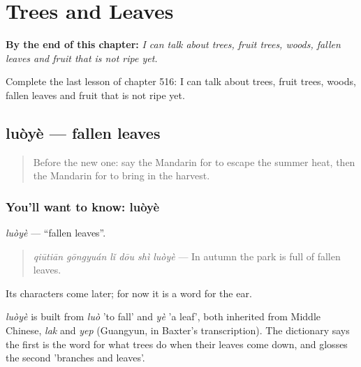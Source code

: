 
\chapter{Trees and Leaves}
\label{ch:zh-trees-and-leaves}

\begin{chapteropening}
\textbf{By the end of this chapter:} \emph{I can talk about trees, fruit trees, woods, fallen leaves and fruit that is not ripe yet.}

Complete the last lesson of chapter 516: I can talk about trees, fruit trees, woods, fallen leaves and fruit that is not ripe yet.
\end{chapteropening}

\section[luòyè]{luòyè — fallen leaves}

\label{lesson:ZH-C516-luoye}



\begin{quote}
Before the new one: say the Mandarin for to escape the summer heat, then the Mandarin for to bring in the harvest.
\end{quote}

\subsection*{You'll want to know: luòyè}
\emph{luòyè} — \textquotedblleft{}fallen leaves\textquotedblright{}.

\begin{quote}
\emph{qiūtiān gōngyuán lǐ dōu shì luòyè} — In autumn the park is full of fallen leaves.
\end{quote}

Its characters come later; for now it is a word for the ear.

\begin{cousinweb}
\emph{luòyè} is built from \emph{luò} 'to fall' and \emph{yè} 'a leaf', both inherited from Middle Chinese, \emph{lak} and \emph{yep} (Guangyun, in Baxter's transcription). The dictionary says the first is the word for what trees do when their leaves come down, and glosses the second 'branches and leaves'.
\end{cousinweb}

